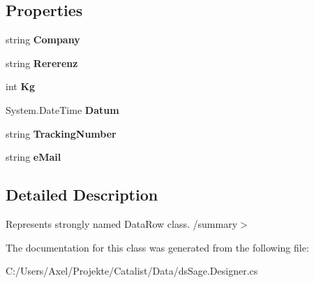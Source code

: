 \subsection*{Properties}
\begin{DoxyCompactItemize}
\item 
string {\bfseries Company}\hypertarget{class_products_1_1_data_1_1ds_sage_1_1_ups_shipping_row_aa7673198739e2691b2ff645b29a4f359}{}\label{class_products_1_1_data_1_1ds_sage_1_1_ups_shipping_row_aa7673198739e2691b2ff645b29a4f359}

\item 
string {\bfseries Rererenz}\hypertarget{class_products_1_1_data_1_1ds_sage_1_1_ups_shipping_row_a41c9d8001f2a2570c620deb06a2477f1}{}\label{class_products_1_1_data_1_1ds_sage_1_1_ups_shipping_row_a41c9d8001f2a2570c620deb06a2477f1}

\item 
int {\bfseries Kg}\hypertarget{class_products_1_1_data_1_1ds_sage_1_1_ups_shipping_row_ad1740a8e220fd8771e3dd7ea4386efa4}{}\label{class_products_1_1_data_1_1ds_sage_1_1_ups_shipping_row_ad1740a8e220fd8771e3dd7ea4386efa4}

\item 
System.\+Date\+Time {\bfseries Datum}\hypertarget{class_products_1_1_data_1_1ds_sage_1_1_ups_shipping_row_a7dc5cdd261807f8dd67f7943725833b7}{}\label{class_products_1_1_data_1_1ds_sage_1_1_ups_shipping_row_a7dc5cdd261807f8dd67f7943725833b7}

\item 
string {\bfseries Tracking\+Number}\hypertarget{class_products_1_1_data_1_1ds_sage_1_1_ups_shipping_row_a5072057c43eef8cd63b79fe4156332f3}{}\label{class_products_1_1_data_1_1ds_sage_1_1_ups_shipping_row_a5072057c43eef8cd63b79fe4156332f3}

\item 
string {\bfseries e\+Mail}\hypertarget{class_products_1_1_data_1_1ds_sage_1_1_ups_shipping_row_a87c699c03dc94c1493be41ccbf918fa6}{}\label{class_products_1_1_data_1_1ds_sage_1_1_ups_shipping_row_a87c699c03dc94c1493be41ccbf918fa6}

\end{DoxyCompactItemize}


\subsection{Detailed Description}
Represents strongly named Data\+Row class. /summary$>$ 

The documentation for this class was generated from the following file\+:\begin{DoxyCompactItemize}
\item 
C\+:/\+Users/\+Axel/\+Projekte/\+Catalist/\+Data/ds\+Sage.\+Designer.\+cs\end{DoxyCompactItemize}
